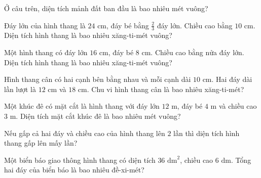 \begin{ex}
  Ở câu trên, diện tích mảnh đất ban đầu là bao nhiêu mét vuông?
\end{ex}

\begin{ex}
  Đáy lớn của hình thang là $24\text{ cm}$, đáy bé bằng $\frac{2}{3}$ đáy lớn. Chiều cao bằng $10\text{ cm}$. Diện tích hình thang là bao nhiêu xăng-ti-mét vuông?
\end{ex}

\begin{ex}
  Một hình thang có đáy lớn $16\text{ cm}$, đáy bé $8\text{ cm}$. Chiều cao bằng nửa đáy lớn. Diện tích hình thang là bao nhiêu xăng-ti-mét vuông?
\end{ex}

\begin{ex}
  Hình thang cân có hai cạnh bên bằng nhau và mỗi cạnh dài $10\text{ cm}$. Hai đáy dài lần lượt là $12\text{ cm}$ và $18\text{ cm}$. Chu vi hình thang cân là bao nhiêu xăng-ti-mét?
\end{ex}

\begin{ex}
  Một khúc đê có mặt cắt là hình thang với đáy lớn $12\text{ m}$, đáy bé $4\text{ m}$ và chiều cao $3\text{ m}$. Diện tích mặt cắt khúc đê là bao nhiêu mét vuông?
\end{ex}

\begin{ex}
  Nếu gấp cả hai đáy và chiều cao của hình thang lên $2$ lần thì diện tích hình thang gấp lên mấy lần?
\end{ex}

\begin{ex}
  Một biển báo giao thông hình thang có diện tích $36\text{ dm}^2$, chiều cao $6\text{ dm}$. Tổng hai đáy của biển báo là bao nhiêu đề-xi-mét?
\end{ex}

